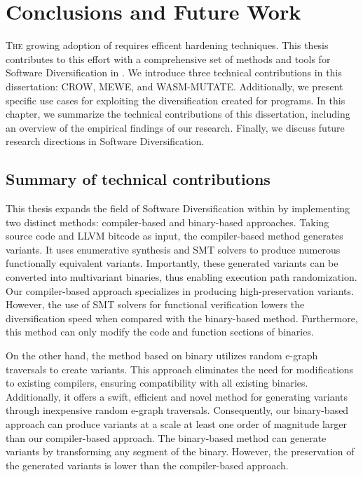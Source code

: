 
\chapter{Conclusions and Future Work}
\label{results}


\lettrine[lines=3]{T}{he} growing adoption of \Wasm requires efficent hardening techniques.
This thesis contributes to this effort with a comprehensive set of methods and tools for Software Diversification in \Wasm.
We introduce three technical contributions in this dissertation: CROW, MEWE, and WASM-MUTATE.
Additionally, we present specific use cases for exploiting the diversification created for \Wasm programs.
In this chapter, we summarize the technical contributions of this dissertation, including an overview of the empirical findings of our research.
Finally, we discuss future research directions in \Wasm Software Diversification.

\section{Summary of technical contributions}


This thesis expands the field of Software Diversification within \Wasm by implementing two distinct methods: compiler-based and binary-based approaches. 
Taking source code and LLVM bitcode as input, the compiler-based method generates \Wasm variants.
It uses enumerative synthesis and SMT solvers to produce numerous functionally equivalent variants. 
Importantly, these generated variants can be converted into multivariant binaries, thus enabling execution path randomization. 
Our compiler-based approach specializes in producing high-preservation variants.
However, the use of SMT solvers for functional verification lowers the diversification speed when compared with the binary-based method. 
Furthermore, this method can only modify the code and function sections of \Wasm binaries.

On the other hand, the method based on binary utilizes random e-graph traversals to create variants. 
This approach eliminates the need for modifications to existing compilers, ensuring compatibility with all existing \Wasm binaries. 
Additionally, it offers a swift, efficient and novel method for generating variants through inexpensive random e-graph traversals. 
Consequently, our binary-based approach can produce variants at a scale at least one order of magnitude larger than our compiler-based approach. 
The binary-based method can generate variants by transforming any segment of the \wasm binary.
However, the preservation of the generated variants is lower than the compiler-based approach.

